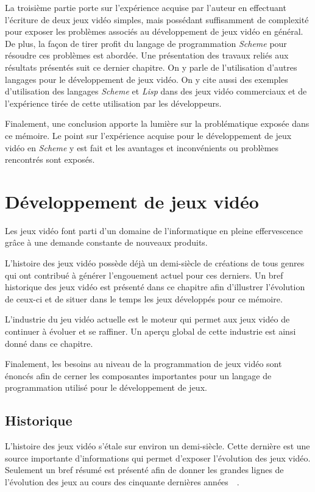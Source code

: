 \documentclass[12pt,twoside,letterpaper,francais]{book}
\newcommand{\lisp}{{\textit{Lisp }}}
\newcommand{\Schemelang}{{\textit{Scheme }}}
\begin{document}
La troisième partie porte sur l'expérience acquise par l'auteur en
effectuant l'écriture de deux jeux vidéo simples, mais possédant
suffisamment de complexité pour exposer les problèmes associés au
développement de jeux vidéo en général. De plus, la façon de tirer
profit du langage de programmation \Schemelang pour résoudre ces
problèmes est abordée. Une présentation des travaux reliés aux
résultats présentés suit ce dernier chapitre. On y parle de
l'utilisation d'autres langages pour le développement de jeux
vidéo. On y cite aussi des exemples d'utilisation des langages
\Schemelang et \lisp dans des jeux vidéo commerciaux et de
l'expérience tirée de cette utilisation par les développeurs.

Finalement, une conclusion apporte la lumière sur la problématique
exposée dans ce mémoire. Le point sur l'expérience acquise pour le
développement de jeux vidéo en \Schemelang y est fait et les avantages
et inconvénients ou problèmes rencontrés sont exposés.


\clearpage

\chapter{Développement de jeux vidéo} \label{Chap:JV}
Les jeux vidéo font parti d'un domaine de l'informatique en pleine
effervescence grâce à une demande constante de nouveaux
produits. 

L'histoire des jeux vidéo possède déjà un demi-siècle de créations de
tous genres qui ont contribué à générer l'engouement actuel pour ces
derniers. Un bref historique des jeux vidéo est présenté dans ce
chapitre afin d'illustrer l'évolution de ceux-ci et de situer
dans le temps les jeux développés pour ce mémoire.

L'industrie du jeu vidéo actuelle est le moteur qui permet aux jeux
vidéo de continuer à évoluer et se raffiner. Un aperçu global de cette
industrie est ainsi donné dans ce chapitre.

Finalement, les besoins au niveau de la programmation de jeux vidéo
sont énoncés afin de cerner les composantes importantes pour un
langage de programmation utilisé pour le développement de jeux.


\FloatBarrier
\section{Historique}
L'histoire des jeux vidéo s'étale sur environ un demi-siècle. Cette
dernière est une source importante d'informations qui permet d'exposer
l'évolution des jeux vidéo. Seulement un bref résumé est présenté afin
de donner les grandes lignes de l'évolution des jeux au cours des
cinquante dernières années~\cite{VIDEOGAMES_history}~\cite{HISCORE}.
\end{document}
